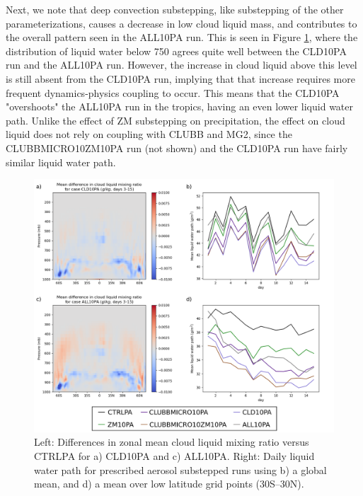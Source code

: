 \documentclass [11pt, proquest] {uwthesis}[2020/02/24]
\begin{document}
Next, we note that deep convection substepping, like substepping of the other parameterizations, causes a decrease in low cloud liquid mass, and contributes to the overall pattern seen in the ALL10PA run. This is seen in Figure \ref{fig:cldliq-pa}, where the distribution of liquid water below \SI{750}{\millibar} agrees quite well between the CLD10PA run and the ALL10PA run. However, the increase in cloud liquid above this level is still absent from the CLD10PA run, implying that that increase requires more frequent dynamics-physics coupling to occur. This means that the CLD10PA "overshoots" the ALL10PA run in the tropics, having an even lower liquid water path. Unlike the effect of ZM substepping on precipitation, the effect on cloud liquid does not rely on coupling with CLUBB and MG2, since the CLUBBMICRO10ZM10PA run (not shown) and the CLD10PA run have fairly similar liquid water path.

\begin{figure}
    \centering
    \includegraphics[width=6.5in]{Figure14.png}
    \caption[Comparison of cloud liquid mass between short prescribed-aerosol EAMv1 runs using different forms of substepping.]{Left: Differences in zonal mean cloud liquid mixing ratio versus CTRLPA for a) CLD10PA and c) ALL10PA. Right: Daily liquid water path for prescribed aerosol substepped runs using b) a global mean, and d) a mean over low latitude grid points (\num{30}S--\num{30}N).}
    \label{fig:cldliq-pa}
\end{figure}
\end{document}
